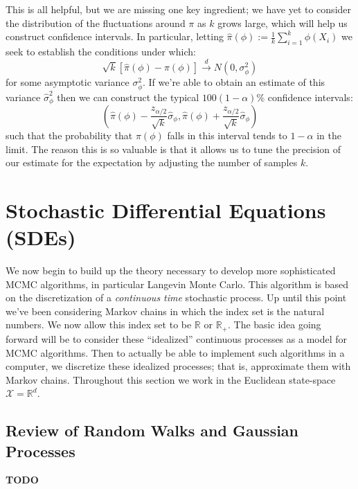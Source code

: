 \documentclass[12pt]{article}
\newcommand{\R}{\mathcal{R}}
\def\R{\mathbb{R}}
\begin{document}
This is all helpful, but we are missing one key ingredient; we have yet to consider the distribution of the fluctuations around $\pi$ as $k$ grows large, which will help us 
construct confidence intervals. In particular, letting $\hat{\pi}(\phi) := \frac{1}{k} \sum_{i = 1}^{k} \phi(X_i)$ we seek to establish the conditions under which: 
\[\sqrt{k}[\hat{\pi}(\phi) - \pi(\phi)] \overset{d}{\to} N(0, \sigma_\phi^2)\]
for some asymptotic variance $\sigma_\phi^2$. If we're able to obtain an estimate of this variance $\hat{\sigma}_\phi^2$ then we can construct the typical 
$100(1 - \alpha)\%$ confidence intervals: 
\[\left(\hat{\pi}(\phi) - \frac{z_{\alpha/2}}{\sqrt{k}}\hat{\sigma}_\phi, \hat{\pi}(\phi) + \frac{z_{\alpha/2}}{\sqrt{k}}\hat{\sigma}_\phi \right)\]
such that the probability that $\pi(\phi)$ falls in this interval tends to $1 - \alpha$ in the limit. The reason this is so valuable is that it allows us to tune the precision 
of our estimate for the expectation by adjusting the number of samples $k$. 

\section{Stochastic Differential Equations (SDEs)}
We now begin to build up the theory necessary to develop more sophisticated MCMC algorithms, in particular Langevin Monte Carlo. This algorithm is based on the 
discretization of a \textit{continuous time} stochastic process. Up until this point we've been considering Markov chains in which the index set is the natural numbers. 
We now allow this index set to be $\R$ or $\R_+$. The basic idea going forward will be to consider these ``idealized'' continuous processes as a model for MCMC algorithms. 
Then to actually be able to implement such algorithms in a computer, we discretize these idealized processes; that is, approximate them with Markov chains. Throughout this 
section we work in the Euclidean state-space $\mathcal{X} = \R^d$. 

\subsection{Review of Random Walks and Gaussian Processes}
\textbf{TODO}
\end{document}
